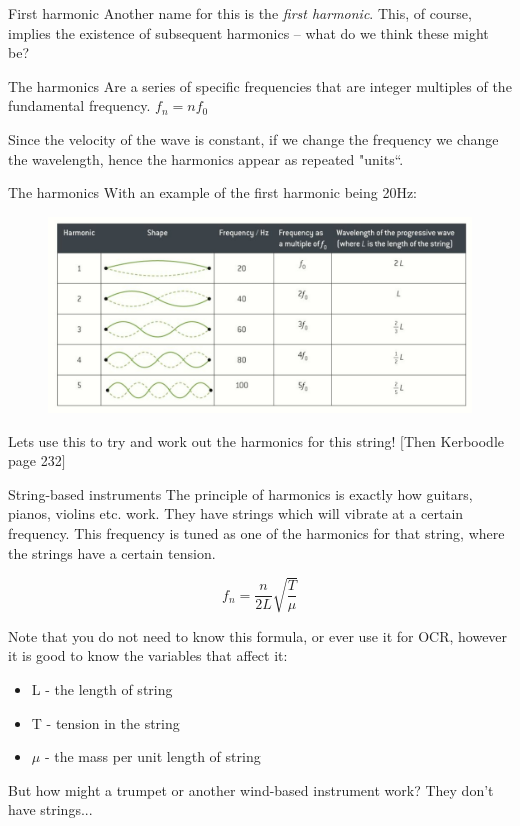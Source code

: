 \documentclass[../Main.tex]{subfiles}
\begin{document}
\begin{frame}{First harmonic}
    Another name for this is the \emph{first harmonic}. This, of course, implies the existence of subsequent harmonics -- what do we think these might be? \pause
    
    \begin{block}{The harmonics}
    Are a series of specific frequencies that are integer multiples of the fundamental frequency. $f_n = n f_0$
    \end{block}
    
    Since the velocity of the wave is constant, if we change the frequency we change the wavelength, hence the harmonics appear as repeated "units``.
\end{frame}

\begin{frame}{The harmonics}
With an example of the first harmonic being 20Hz:
    \begin{figure}
        \centering
        \includegraphics[width=\textwidth]{Waves_Images/theharmonics.jpg}
    \end{figure}
    Lets use this to try and work out the harmonics for this string! $[$Then Kerboodle page 232$]$
\end{frame}

\begin{frame}{String-based instruments}
    The principle of harmonics is exactly how guitars, pianos, violins etc. work. They have strings which will vibrate at a certain frequency. This frequency is tuned as one of the harmonics for that string, where the strings have a certain tension. 
    
    \begin{equation*}
        f_n = \frac{n}{2L}\sqrt{\frac{T}{\mu}}
    \end{equation*}
    
    Note that you do not need to know this formula, or ever use it for OCR, however it is good to know the variables that affect it: 
    \begin{itemize}
        \item L - the length of string
        \item T - tension in the string
        \item $\mu$ - the mass per unit length of string
    \end{itemize}
    \pause
    But how might a trumpet or another wind-based instrument work? They don't have strings...
\end{frame}
\end{document}
